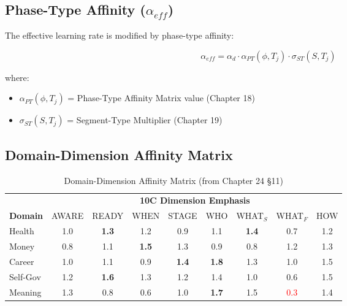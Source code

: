 \subsection{Phase-Type Affinity ($\alpha_{eff}$)}

The effective learning rate is modified by phase-type affinity:

\begin{equation}
\alpha_{eff} = \alpha_d \cdot \alpha_{PT}(\phi, T_j) \cdot \sigma_{ST}(S, T_j)
\label{eq:alpha-eff}
\end{equation}

where:
\begin{itemize}
\item $\alpha_{PT}(\phi, T_j)$ = Phase-Type Affinity Matrix value (Chapter 18)
\item $\sigma_{ST}(S, T_j)$ = Segment-Type Multiplier (Chapter 19)
\end{itemize}

\subsection{Domain-Dimension Affinity Matrix}

\begin{table}[htbp]
\centering
\caption{Domain-Dimension Affinity Matrix (from Chapter 24 §11)\footnotemark}
\label{tab:domain-type-affinity}
\renewcommand{\arraystretch}{1.2}
\begin{tabular}{@{}lcccccccc@{}}
\toprule
& \multicolumn{8}{c}{\textbf{10C Dimension Emphasis}} \\
\cmidrule{2-9}
\textbf{Domain} & AWARE & READY & WHEN & STAGE & WHO & WHAT$_S$ & WHAT$_F$ & HOW \\
\midrule
Health & 1.0 & \textbf{1.3} & 1.2 & 0.9 & 1.1 & \textbf{1.4} & 0.7 & 1.2 \\
Money & 0.8 & 1.1 & \textbf{1.5} & 1.3 & 0.9 & 0.8 & 1.2 & 1.3 \\
Career & 1.0 & 1.1 & 0.9 & \textbf{1.4} & \textbf{1.8} & 1.3 & 1.0 & 1.5 \\
Self-Gov & 1.2 & \textbf{1.6} & 1.3 & 1.2 & 1.4 & 1.0 & 0.6 & 1.5 \\
Meaning & 1.3 & 0.8 & 0.6 & 1.0 & \textbf{1.7} & 1.5 & \textcolor{red}{0.3} & 1.4 \\
\bottomrule
\end{tabular}
\end{table}


